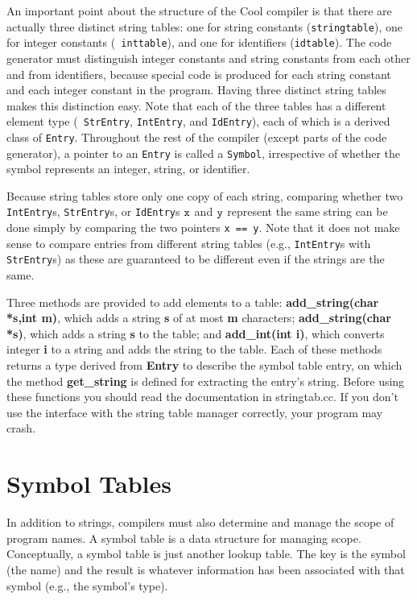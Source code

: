 \documentclass[11pt]{article}
\def\U#1{{\sf{}#1}}
\def\C#1{{\bf{}#1}}
\begin{document}
An important point about the structure of the Cool compiler is that
there are actually three distinct string tables: one for string
constants ({\tt stringtable}), one for integer constants ({\tt
inttable}), and one for identifiers ({\tt idtable}).  The code
generator must distinguish integer constants and string constants
from each other and from identifiers, because special code is produced
for each string constant and each integer constant in the program.
Having three distinct string tables makes this distinction easy.  Note
that each of the three tables has a different element type ({\tt
StrEntry}, {\tt IntEntry}, and {\tt IdEntry}), each of which is a
derived class of {\tt Entry}.  Throughout the rest of the compiler
(except parts of the code generator), a pointer to an {\tt Entry} is
called a {\tt Symbol}, irrespective of whether the symbol represents
an integer, string, or identifier.

Because string tables store only one copy of each string, comparing
whether two {\tt IntEntry}s, {\tt StrEntry}s, or {\tt IdEntry}s $\tt x$
and $\tt y$ represent the same string can be done simply by comparing
the two pointers {\tt x == y}.  Note that it does not make sense to
compare entries from different string tables (e.g., {\tt IntEntry}s
with {\tt StrEntry}s) as these are guaranteed to be different even if
the strings are the same.


Three
methods are provided to add elements to a table: \C{add\_string(char *s,int m)},
which adds a string \C{s} of at most \C{m} characters; \C{add\_string(char *s)},
which adds a string \C{s} to the table; and \C{add\_int(int i)}, which converts
integer \C{i} to a string and adds the string to the table.
Each of these methods returns a type derived from \C{Entry}
to describe the symbol table entry,  on which the method \C{get\_string}
is defined for extracting the entry's string.  Before using these functions you
should read the documentation in \U{stringtab.cc}.  If you don't use
the interface with the string table manager correctly, your program may
crash.

\section{Symbol Tables}

In addition to strings, compilers must also determine and manage the
scope of program names.  A symbol table is a data structure for
managing scope.  Conceptually, a symbol table is just another lookup
table.  The key is the symbol (the name) and the result is whatever
information has been associated with that symbol (e.g., the symbol's
type).
\end{document}
